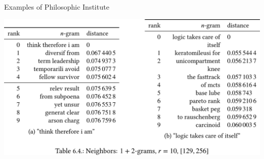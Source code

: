 \documentclass[14pt,t]{beamer}
\begin{document}
\begin{frame}[c]{Examples of Philosophic Institute}
    \begin{center}
        \includegraphics[width = \textwidth]{img/table-nn-semigood}
    \end{center}
\end{frame}
\end{document}
